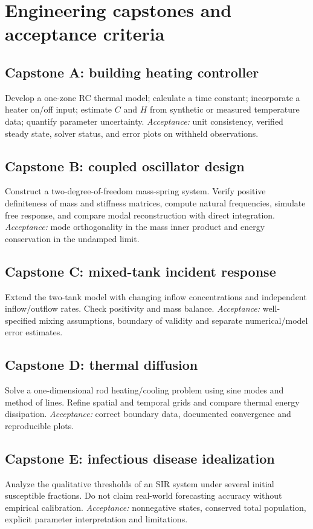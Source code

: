 \documentclass[11pt,letterpaper,oneside]{report}
\theoremstyle{definition}\newtheorem{definition}[theorem]{Definition}
\theoremstyle{remark}\newtheorem{remark}[theorem]{Remark}
\begin{document}
\chapter{Engineering capstones and acceptance criteria}
\section{Capstone A: building heating controller}
Develop a one-zone RC thermal model; calculate a time constant; incorporate a heater on/off input; estimate $C$ and $H$ from synthetic or measured temperature data; quantify parameter uncertainty. \emph{Acceptance:} unit consistency, verified steady state, solver status, and error plots on withheld observations.
\section{Capstone B: coupled oscillator design}
Construct a two-degree-of-freedom mass-spring system. Verify positive definiteness of mass and stiffness matrices, compute natural frequencies, simulate free response, and compare modal reconstruction with direct integration. \emph{Acceptance:} mode orthogonality in the mass inner product and energy conservation in the undamped limit.
\section{Capstone C: mixed-tank incident response}
Extend the two-tank model with changing inflow concentrations and independent inflow/outflow rates. Check positivity and mass balance. \emph{Acceptance:} well-specified mixing assumptions, boundary of validity and separate numerical/model error estimates.
\section{Capstone D: thermal diffusion}
Solve a one-dimensional rod heating/cooling problem using sine modes and method of lines. Refine spatial and temporal grids and compare thermal energy dissipation. \emph{Acceptance:} correct boundary data, documented convergence and reproducible plots.
\section{Capstone E: infectious disease idealization}
Analyze the qualitative thresholds of an SIR system under several initial susceptible fractions. Do not claim real-world forecasting accuracy without empirical calibration. \emph{Acceptance:} nonnegative states, conserved total population, explicit parameter interpretation and limitations.
\end{document}
